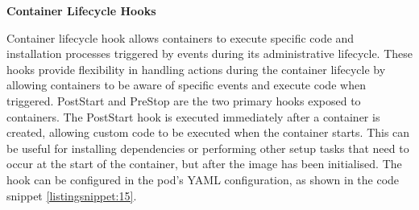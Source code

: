 
\textbf{Container Lifecycle Hooks}


Container lifecycle hook allows containers to execute specific code and installation processes triggered by events during its administrative lifecycle. These hooks provide flexibility in handling actions during the container lifecycle by allowing containers to be aware of specific events and execute code when triggered. PostStart and PreStop are the two primary hooks exposed to containers. The PostStart hook is executed immediately after a container is created, allowing custom code to be executed when the container starts. This can be useful for installing dependencies or performing other setup tasks that need to occur at the start of the container, but after the image has been initialised. The hook can be configured in the pod's YAML configuration, as shown in the code snippet \autoref{listingsnippet:15}. 

